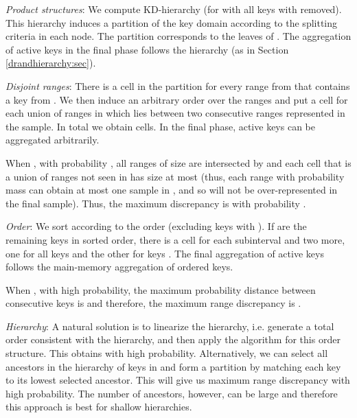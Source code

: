 \documentclass[11pt]{article}
\begin{document}
\begin{trivlist}
\item {\em Product structures}: 
We compute  {\sc KD-hierarchy} (for  with 
all keys with  removed).
This hierarchy  induces a partition of the key domain
according to the splitting criteria in each node.  
The partition  corresponds to the leaves of .
The aggregation of active keys in the final phase follows the
hierarchy  (as in Section \ref{drandhierarchy:sec}).

\item {\em Disjoint ranges}: 
There is a cell in the partition for every range from 
that contains a key from .
We then induce an arbitrary order over the ranges
and put a cell for each union of ranges in  
which lies between two
consecutive ranges represented in the sample.  
In total we obtain  cells.   
In the final phase, active keys can be aggregated arbitrarily.

When ,
with probability , all ranges of size  are
 intersected by  and each cell  that is a union of ranges not
 seen in  has size at most  
(thus, each range  with probability mass  
  can obtain at most one sample in , and so will not be
  over-represented in the final sample).  
Thus, the maximum discrepancy is
   with probability .

\item {\em Order}:
 We sort  according to the order (excluding keys with
).  
If  are the remaining keys in sorted order, 
there is a cell  for each subinterval
  and two more, 
 one for all keys  and the other for keys  . 
The final aggregation of active keys follows the main-memory
aggregation of ordered keys. 

When , with high probability, the maximum
probability distance between consecutive keys is  and therefore,
the maximum range discrepancy is .

\item {\em Hierarchy}:
A natural solution is to linearize the hierarchy, i.e. 
generate a total order consistent with the hierarchy, 
and then apply the algorithm for this order
structure.
This obtains  with high probability. 
Alternatively, we can select all ancestors in the hierarchy of keys
 in  and form a partition by matching each key to its lowest
 selected ancestor.  This will give us maximum range discrepancy
   with high probability.   
The number of ancestors, however, can be large and therefore
this approach is best for shallow hierarchies.  
\end{trivlist}
\end{document}
